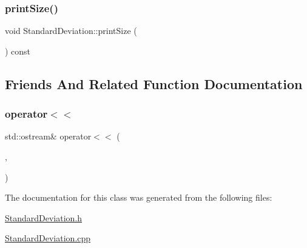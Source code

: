\mbox{\label{class_standard_deviation_aaad77ff46dc7bc16d870e8569161d9b4}} 
\subsubsection{\texorpdfstring{print\+Size()}{printSize()}}
{\footnotesize\ttfamily void Standard\+Deviation\+::print\+Size (\begin{DoxyParamCaption}\item[{std\+::ostream \&}]{ }\end{DoxyParamCaption}) const}



\subsection{Friends And Related Function Documentation}
\mbox{\label{class_standard_deviation_a983ad4d351fca4bad35c367110ba27e2}} 
\subsubsection{\texorpdfstring{operator$<$$<$}{operator<<}}
{\footnotesize\ttfamily std\+::ostream\& operator$<$$<$ (\begin{DoxyParamCaption}\item[{std\+::ostream \&}]{,  }\item[{const \mbox{\hyperlink{class_standard_deviation}{Standard\+Deviation}} \&}]{ }\end{DoxyParamCaption})\hspace{0.3cm}{\ttfamily [friend]}}



The documentation for this class was generated from the following files\+:\begin{DoxyCompactItemize}
\item 
\mbox{\hyperlink{_standard_deviation_8h}{Standard\+Deviation.\+h}}\item 
\mbox{\hyperlink{_standard_deviation_8cpp}{Standard\+Deviation.\+cpp}}\end{DoxyCompactItemize}
